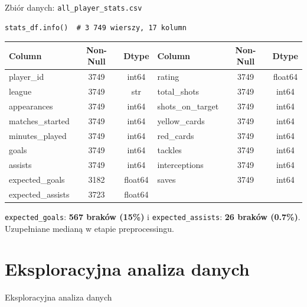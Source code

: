 \documentclass[aspectratio=169]{beamer}
\begin{document}
\begin{frame}[fragile]{Zbiór danych: \texttt{all\_player\_stats.csv}}

    \begin{lstlisting}
stats_df.info()  # 3 749 wierszy, 17 kolumn
    \end{lstlisting}
    \small{
    \begin{tabular}{lcc|lcc}
        \toprule
        \textbf{Column} & \textbf{Non-Null} & \textbf{Dtype} & \textbf{Column} & \textbf{Non-Null} & \textbf{Dtype} \\
        \midrule
        player\_id & 3749 & int64 & rating & 3749 & float64 \\
        league & 3749 & str & total\_shots & 3749 & int64 \\
        appearances & 3749 & int64 & shots\_on\_target & 3749 & int64 \\
        matches\_started & 3749 & int64 & yellow\_cards & 3749 & int64 \\
        minutes\_played & 3749 & int64 & red\_cards & 3749 & int64 \\
        goals & 3749 & int64 & tackles & 3749 & int64 \\
        assists & 3749 & int64 & interceptions & 3749 & int64 \\
        expected\_goals & 3182 & float64 & saves & 3749 & int64 \\
        expected\_assists & 3723 & float64 & & & \\
        \bottomrule
    \end{tabular}}

    \vspace{0.4cm}
    
    \texttt{expected\_goals}: \textbf{567 braków (15\%)} i \texttt{expected\_assists}: \textbf{26 braków (0.7\%)}. Uzupełniane medianą w etapie preprocessingu.
    
\end{frame}



\section{Eksploracyjna analiza danych}

\begin{frame}[c]
    \centering
    \vfill
    { Eksploracyjna analiza danych}
    \vfill
\end{frame}
\end{document}
